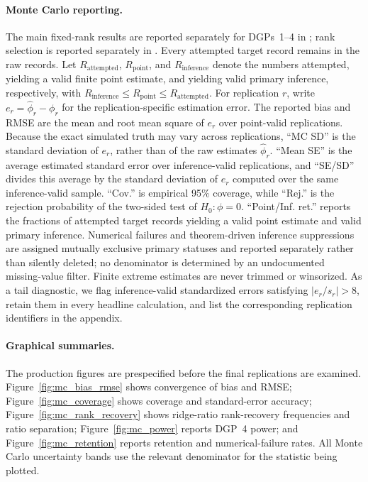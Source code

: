 \documentclass[11pt]{article}
\numberwithin{equation}{section}
\theoremstyle{remark}
\begin{document}
\paragraph{Monte Carlo reporting.}
The main fixed-rank results are reported separately for DGPs~1--4 in ; rank selection is reported separately in . Every attempted target record remains in the raw records. Let $R_{\mathrm{attempted}}$, $R_{\mathrm{point}}$, and $R_{\mathrm{inference}}$ denote the numbers attempted, yielding a valid finite point estimate, and yielding valid primary inference, respectively, with $R_{\mathrm{inference}}\le R_{\mathrm{point}}\le R_{\mathrm{attempted}}$. For replication $r$, write $e_r=\widehat\phi_r-\phi_r$ for the replication-specific estimation error. The reported bias and RMSE are the mean and root mean square of $e_r$ over point-valid replications. Because the exact simulated truth may vary across replications, ``MC SD'' is the standard deviation of $e_r$, rather than of the raw estimates $\widehat\phi_r$. ``Mean SE'' is the average estimated standard error over inference-valid replications, and ``SE/SD'' divides this average by the standard deviation of $e_r$ computed over the same inference-valid sample. ``Cov.'' is empirical 95\% coverage, while ``Rej.'' is the rejection probability of the two-sided test of $H_0:\phi=0$. ``Point/Inf. ret.'' reports the fractions of attempted target records yielding a valid point estimate and valid primary inference. Numerical failures and theorem-driven inference suppressions are assigned mutually exclusive primary statuses and reported separately rather than silently deleted; no denominator is determined by an undocumented missing-value filter. Finite extreme estimates are never trimmed or winsorized. As a tail diagnostic, we flag inference-valid standardized errors satisfying $|e_r/\widehat s_r|>8$, retain them in every headline calculation, and list the corresponding replication identifiers in the appendix.













\paragraph{Graphical summaries.}
The production figures are prespecified before the final replications are examined. Figure~\ref{fig:mc_bias_rmse} shows convergence of bias and RMSE; Figure~\ref{fig:mc_coverage} shows coverage and standard-error accuracy; Figure~\ref{fig:mc_rank_recovery} shows ridge-ratio rank-recovery frequencies and ratio separation; Figure~\ref{fig:mc_power} reports DGP~4 power; and Figure~\ref{fig:mc_retention} reports retention and numerical-failure rates. All Monte Carlo uncertainty bands use the relevant denominator for the statistic being plotted.
\end{document}
